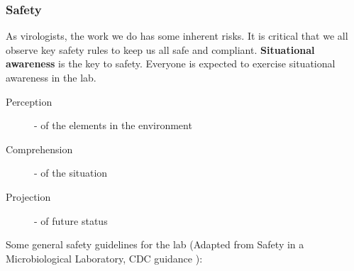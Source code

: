 \documentclass[10pt, letterpaper, twocolumn]{article} %
\begin{document}
\subsubsection{Safety}
As virologists, the work we do has some inherent risks. It is critical that we all observe key safety rules to keep us all safe and compliant.\newline \newline
{\bfseries Situational awareness} is the key to safety. Everyone is expected to exercise situational awareness in the lab.

\begin{description}
\item [Perception] - of the elements in the environment
\item [Comprehension] - of the situation
\item [Projection] - of future status
\end{description}
Some general safety guidelines for the lab (Adapted from Safety in a Microbiological Laboratory, CDC guidance \citep{US_Department_of_Health_and_Human_Services2020-ck}):
\end{document}
